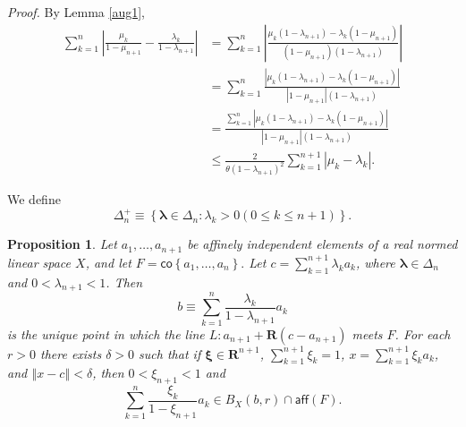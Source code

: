 \documentclass[11pt]{article}%
\newtheorem{proposition}[theorem]{Proposition}
\newenvironment{proof}[1][Proof]{\noindent\textit{#1.} }{}
\begin{document}
\begin{proof}
By Lemma \ref{aug1},%
\begin{align}
\sum_{k=1}^{n}\left\vert \frac{\mu_{k}}{1-\mu_{n+1}}-\frac{\lambda_{k}%
}{1-\lambda_{n+1}}\right\vert  &  =\sum_{k=1}^{n}\left\vert \frac{\mu
_{k}(1-\lambda_{n+1})-\lambda_{k}(1-\mu_{n+1})}{(1-\mu_{n+1})(1-\lambda
_{n+1})}\right\vert \nonumber\\
&  =\sum_{k=1}^{n}\frac{\left\vert \mu_{k}(1-\lambda_{n+1})-\lambda_{k}%
(1-\mu_{n+1})\right\vert }{\left\vert 1-\mu_{n+1}\right\vert \left(
1-\lambda_{n+1}\right)  }\nonumber\\
&  =\frac{\sum_{k=1}^{n}\left\vert \mu_{k}(1-\lambda_{n+1})-\lambda_{k}%
(1-\mu_{n+1})\right\vert }{\left\vert 1-\mu_{n+1}\right\vert \left(
1-\lambda_{n+1}\right)  }\nonumber\\
&  \leq\frac{2}{\theta\left(  1-\lambda_{n+1}\right)  ^{2}}\sum_{k=1}%
^{n+1}\left\vert \mu_{k}-\lambda_{k}\right\vert . \tag*{$\square$}%
\end{align}

\end{proof}

We define%
\[
\Delta_{n}^{+}\equiv\left\{  \mathbf{\lambda}\in\Delta_{n}:\lambda_{k}>0\text{
}(0\leq k\leq n+1)\right\}  .
\]


\begin{proposition}
\label{jul31l1}Let $a_{1},\ldots,a_{n+1}$ be affinely independent elements of
a real normed linear space $X$, and let $F=\mathsf{co}\left\{  a_{1}%
,\ldots,a_{n}\right\}  .$ Let $c=\sum_{k=1}^{n+1}\lambda_{k}a_{k}$, where
$\mathbf{\lambda}\in\Delta_{n}$ and $0<\lambda_{n+1}<1$. Then%
\[
b\equiv\sum_{k=1}^{n}\frac{\lambda_{k}}{1-\lambda_{n+1}}a_{k}%
\]
is the unique point in which the line $L:a_{n+1}+\mathbf{R}(c-a_{n+1})$ meets
$F$. For each $r>0$ there exists $\delta>0$ such that if $\mathbf{\xi}%
\in\mathbf{R}^{n+1}$, $\sum_{k=1}^{n+1}\xi_{k}=1$, $x=\sum_{k=1}^{n+1}\xi
_{k}a_{k}$, and $\left\Vert x-c\right\Vert <\delta$, then $0<\xi_{n+1}<1$ and%
\begin{equation}
\sum_{k=1}^{n}\frac{\xi_{k}}{1-\xi_{n+1}}a_{k}\in B_{X}(b,r)\cap
\mathsf{aff}(F). \label{La4}%
\end{equation}

\end{proposition}
\end{document}
